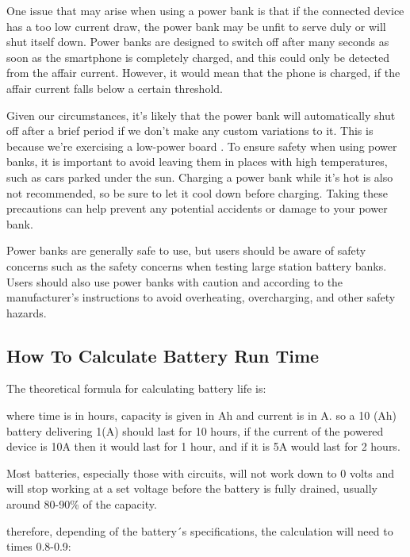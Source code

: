 One issue that may arise when using a power bank is that if the connected device has a too low current draw, the power bank may be unfit to serve duly or will shut itself down. Power banks are designed to switch off after many seconds as soon as the smartphone is completely charged, and this could only be detected from the affair current. However, it would mean that the phone is charged, if the affair current falls below a certain threshold. 

Given our circumstances, it's likely that the power bank will automatically shut off after a brief period if we don't make any custom variations to it. This is because we're exercising a low-power board \cite{Sunanda:2020}. 
To ensure safety when using power banks, it is important to avoid leaving them in places with high temperatures, such as cars parked under the sun. Charging a power bank while it's hot is also not recommended, so be sure to let it cool down before charging. Taking these precautions can help prevent any potential accidents or damage to your power bank.

Power banks are generally safe to use, but users should be aware of safety concerns such as the safety concerns when testing large station battery banks. Users should also use power banks with caution and according to the manufacturer's instructions to avoid overheating, overcharging, and other safety hazards.


\subsection{How To Calculate Battery Run Time}


The theoretical formula for calculating battery life is: 

\medskip


\medskip

where time is in hours, capacity is given in Ah and current is in A. so a 10 (Ah) battery delivering 1(A) should last for 10 hours, if the current of the powered device is 10A then it would last for 1 hour, and if it is 5A would last for 2 hours. 

Most batteries, especially those with circuits, will not work down to 0 volts and will stop working at a set voltage before the battery is fully drained, usually around 80-90\% of the capacity. 

therefore, depending of the battery´s specifications, the calculation will need to times 0.8-0.9:

